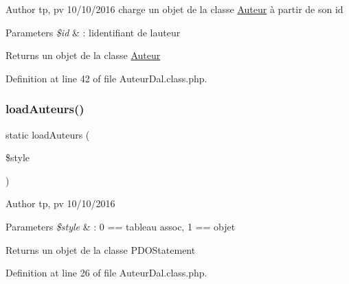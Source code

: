 \begin{DoxyAuthor}{Author}
tp, pv 10/10/2016 charge un objet de la classe \hyperlink{class_auteur}{Auteur} à partir de son id 
\end{DoxyAuthor}

\begin{DoxyParams}{Parameters}
{\em \$id} & \+: l\textquotesingle{}identifiant de l\textquotesingle{}auteur \\
\hline
\end{DoxyParams}
\begin{DoxyReturn}{Returns}
un objet de la classe \hyperlink{class_auteur}{Auteur} 
\end{DoxyReturn}


Definition at line 42 of file Auteur\+Dal.\+class.\+php.

\mbox{\label{class_auteur_dal_a1096258c13846a2b007a333c8a571e61}} 
\subsubsection{\texorpdfstring{load\+Auteurs()}{loadAuteurs()}}
{\footnotesize\ttfamily static load\+Auteurs (\begin{DoxyParamCaption}\item[{}]{\$style }\end{DoxyParamCaption})\hspace{0.3cm}{\ttfamily [static]}}

\begin{DoxyAuthor}{Author}
tp, pv 10/10/2016 
\end{DoxyAuthor}

\begin{DoxyParams}{Parameters}
{\em \$style} & \+: 0 == tableau assoc, 1 == objet \\
\hline
\end{DoxyParams}
\begin{DoxyReturn}{Returns}
un objet de la classe P\+D\+O\+Statement 
\end{DoxyReturn}


Definition at line 26 of file Auteur\+Dal.\+class.\+php.

\mbox{\label{class_auteur_dal_a643d77276a6ac49ba29001ecf1b50439}} 
